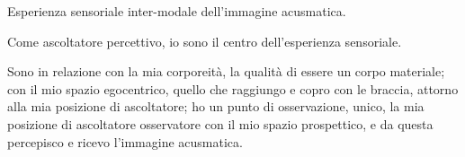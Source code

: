 Esperienza sensoriale inter-modale dell'immagine acusmatica.

Come ascoltatore percettivo, io sono il centro dell'esperienza sensoriale.

Sono in relazione con la mia corporeità, la qualità di essere un corpo materiale; con il mio spazio egocentrico, quello che raggiungo e copro con le braccia, attorno alla mia posizione di ascoltatore; ho un punto di osservazione, unico, la mia posizione di ascoltatore osservatore con il mio spazio prospettico, e da questa percepisco e ricevo l'immagine acusmatica.


\clearpage
